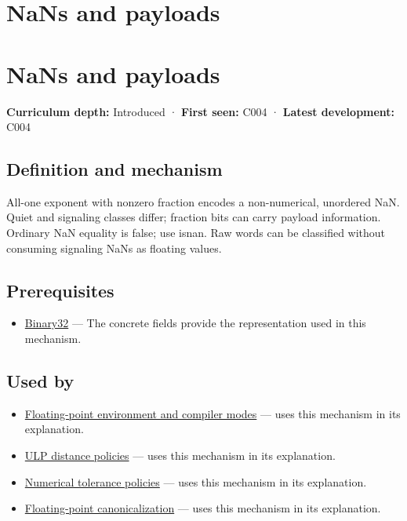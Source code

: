 \hypertarget{appendix-d6607cc4c235}{}
\section*{NaNs and payloads}
\section{NaNs and payloads}\label{nans-and-payloads}

\textbf{Curriculum depth:} Introduced · \textbf{First seen:} C004 · \textbf{Latest development:} C004

\subsection{Definition and mechanism}\label{definition-and-mechanism}

All-one exponent with nonzero fraction encodes a non-numerical, unordered NaN. Quiet and signaling classes differ; fraction bits can carry payload information. Ordinary NaN equality is false; use isnan. Raw words can be classified without consuming signaling NaNs as floating values.

\subsection{Prerequisites}\label{prerequisites}

\begin{itemize}
\tightlist
\item
  \hyperref[appendix-5057f9ad327f]{Binary32} --- The concrete fields provide the representation used in this mechanism.
\end{itemize}

\subsection{Used by}\label{used-by}

\begin{itemize}
\tightlist
\item
  \hyperref[appendix-f11d1a521253]{Floating-point environment and compiler modes} --- uses this mechanism in its explanation.
\item
  \hyperref[appendix-deca299ae4b8]{ULP distance policies} --- uses this mechanism in its explanation.
\item
  \hyperref[appendix-0ec599f8ba27]{Numerical tolerance policies} --- uses this mechanism in its explanation.
\item
  \hyperref[appendix-e90053a4b201]{Floating-point canonicalization} --- uses this mechanism in its explanation.
\end{itemize}

